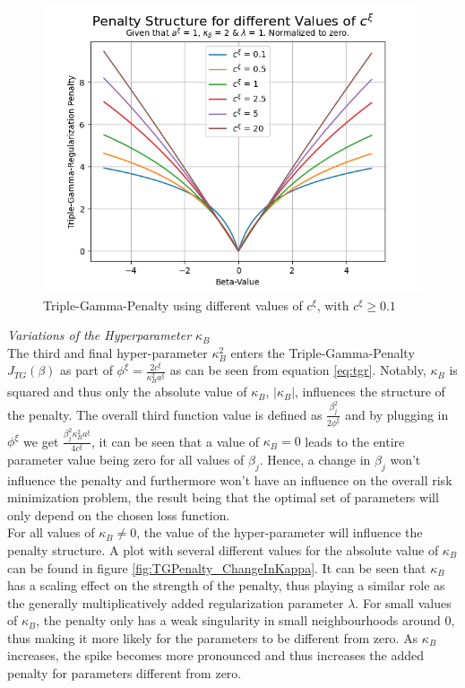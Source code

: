 \documentclass[12pt,a4paper]{article}
\begin{document}
\begin{figure}[!h]
\centering
\includegraphics[scale=0.75]{../02_simulation/021_simulation_figures/TGPenalty_ChangeInC_Part1.png}
\caption{Triple-Gamma-Penalty using different values of $c^\xi$, with $c^\xi \geq 0.1$}
\label{fig:ChangeInC_LargeValues}
\end{figure}

\textit{Variations of the Hyperparameter $\kappa_B$}\\

The third and final hyper-parameter $\kappa_B^2$ enters the Triple-Gamma-Penalty $J_{TG}(\beta)$ as part of $\phi^\xi = \frac{2c^\xi}{\kappa_B^2 a^\xi}$ as can be seen from equation \ref{eq:tgr}. Notably, $\kappa_B$ is squared and thus only the absolute value of $\kappa_B$, $|\kappa_B|$, influences the structure of the penalty. The overall third function value is defined as $\frac{\beta_j^2}{2\phi^\xi}$ and by plugging in $\phi^\xi$ we get $\frac{\beta_j^2\kappa_ B^2a^\xi}{4c^\xi}$, it can be seen that a value of $\kappa_B = 0$ leads to the entire parameter value being zero for all values of $\beta_j$. Hence, a change in $\beta_j$ won't influence the penalty and furthermore won't have an influence on the overall risk minimization problem, the result being that the optimal set of parameters will only depend on the chosen loss function.\\

For all values of $\kappa_B \neq 0$, the value of the hyper-parameter will influence the penalty structure. A plot with several different values for the absolute value of $\kappa_B$ can be found in figure \ref{fig:TGPenalty_ChangeInKappa}. It can be seen that $\kappa_B$ has a scaling effect on the strength of the penalty, thus playing a similar role as the generally multiplicatively added regularization parameter $\lambda$. For small values of $\kappa_B$, the penalty only has a weak singularity in small neighbourhoods around $0$, thus making it more likely for the parameters to be different from zero. As $\kappa_B$ increases, the spike becomes more pronounced and thus increases the added penalty for parameters different from zero. \\
\end{document}
